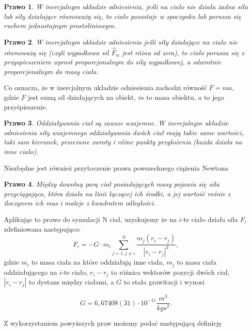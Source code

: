\documentclass[14pt,twoside,a4paper]{article}
\newtheorem{theorem}{Prawo}
\theoremstyle{definition}
\begin{document}
\begin{theorem}
W inercjalnym układzie odniesienia, jeśli na ciało nie działa żadna siła lub siły działające równoważą się, to ciało pozostaje w spoczynku lub porusza się ruchem jednostajnym prostoliniowym.
\end{theorem}

\begin{theorem}
W inercjalnym układzie odniesienia jeśli siły działające na ciało nie równoważą się (czyli wypadkowa sił ${\vec{F}}_{w}$ jest różna od zera), to ciało porusza się z przyspieszeniem wprost proporcjonalnym do siły wypadkowej, a odwrotnie proporcjonalnym do masy ciała.
\end{theorem}
Co oznacza, że w inercjalnym układzie odniesienia zachodzi równość $F=ma$, gdzie $F$ jest sumą sił działających na obiekt, $m$ to masa obiektu, $a$ to jego przyśpieszenie.

\begin{theorem}
Oddziaływania ciał są zawsze wzajemne. W inercjalnym układzie odniesienia siły wzajemnego oddziaływania dwóch ciał mają takie same wartości, taki sam kierunek, przeciwne zwroty i różne punkty przyłożenia (każda działa na inne ciało).
\end{theorem} 

Niezbędne jest również przytoczenie prawa powszechnego ciążenia Newtona \cite[str.956]{fund}
\begin{theorem}
Między dowolną parą ciał posiadających masy pojawia się siła przyciągająca, która działa na linii łączącej ich środki, a jej wartość rośnie z iloczynem ich mas i maleje z kwadratem odległości.
\end{theorem}

Aplikując to prawo do symulacji N ciał, uzyskujemy że na $i$-te ciało działa siła $F_i$ zdefiniowana następująco:\\
$$F_i = -G\cdot m_i \sum_{j=1, j\neq i}^N \frac{m_j(r_i - r_j)}{|r_i - r_j|^3},$$gdzie $m_i$ to masa ciała na które oddziałują inne ciała, $m_j$ to masa ciała oddziałującego na $i$-te ciało, $r_i - r_j$ to różnica wektorów pozycji dwóch ciał, $|r_i - r_j|$ to dystans między ciałami, a $G$ to stała grawitacji i wynosi
\begin{center}
$$G = 6,67408(31)\cdot 10^{-11} \frac{m^{3}}{kg s^2}.$$
\end{center}
Z wykorzystaniem powyższych praw możemy podać następującą definicję
\end{document}
